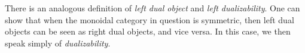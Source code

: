\begin{remark}
    There is an analogous definition of \emph{left dual object} and \emph{left dualizability}. One can show that when the monoidal category in question is symmetric, then left dual objects can be seen as right dual objects, and vice versa. In this case, we then speak simply of \emph{dualizability}.
\end{remark}


%
%
%
%
%
%
%
%
%
%
%
%
%
